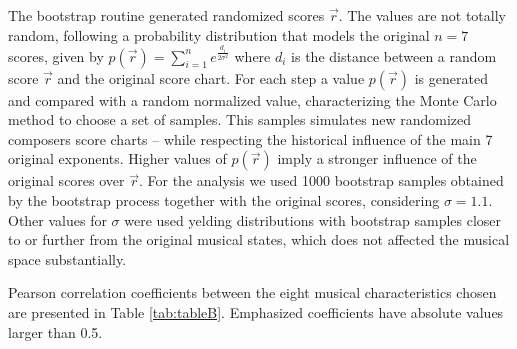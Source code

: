 \documentclass[
 aip,
 jmp,
 amsmath,amssymb,
 reprint,
]{revtex4-1}
\begin{document}
The bootstrap routine generated randomized scores $\vec{r}$. The
values are not totally random, following a probability distribution
that models the original $n = 7$ scores, given by 
$p(\vec{r}) = \sum^n_{i=1} e^{\frac{d_i}{2\sigma^2}}$
where $d_i$ is the distance between a random score $\vec{r}$
and the original score chart. For each step a
value $p(\vec{r})$ is generated and compared with a random normalized value,
characterizing the Monte Carlo~\cite{Robert2011} method to choose a set of samples. This
samples simulates new randomized composers score charts -- while respecting the
historical influence of the main 7 original exponents. Higher
values of $p(\vec{r})$ imply a stronger influence of the original scores
over $\vec{r}$. For the analysis
we used 1000 bootstrap samples obtained by the bootstrap process
together with the original scores,
considering $\sigma = 1.1$. Other values for $\sigma$ were used yelding 
distributions with bootstrap samples closer to or further from the original 
musical states, which does not affected the musical space substantially.

Pearson correlation coefficients between the eight musical
characteristics chosen are presented in Table \ref{tab:tableB}.
Emphasized coefficients have absolute values larger than 0.5.
\end{document}
